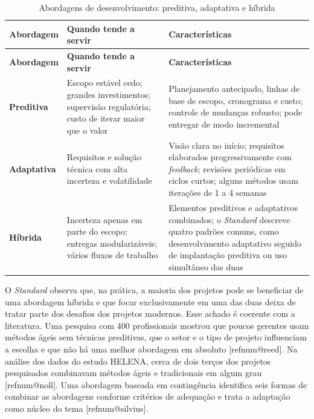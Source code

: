 \documentclass[12pt,a4paper,article,oneside,english,brazil]{abntex2}
\makeatletter
\newcommand{\fontetab}[1]{\par\vspace{3pt}{\small\noindent Fonte: #1\par}}
\newcommand{\refnum}[1]{\csname refnum@#1\endcsname}
\newcommand{\cit}[1]{[\refnum{#1}]}
\makeatother
\begin{document}
\begingroup\SingleSpacing\small
\begin{longtable}{@{}>{\raggedright\arraybackslash}p{}>{\raggedright\arraybackslash}p{}>{\raggedright\arraybackslash}p{}@{}}
\caption{Abordagens de desenvolvimento: preditiva, adaptativa e híbrida}\label{tab:t4}\\
\hline
\textbf{Abordagem} & \textbf{Quando tende a servir} & \textbf{Características}\\
\hline
\endfirsthead
\hline
\textbf{Abordagem} & \textbf{Quando tende a servir} & \textbf{Características}\\
\hline
\endhead
\hline
\endfoot
\hline
\endlastfoot
\textbf{Preditiva} & Escopo estável cedo; grandes investimentos; supervisão regulatória; custo de iterar maior que o valor & Planejamento antecipado, linhas de base de escopo, cronograma e custo; controle de mudanças robusto; pode entregar de modo incremental\\[3pt]
\textbf{Adaptativa} & Requisitos e solução técnica com alta incerteza e volatilidade & Visão clara no início; requisitos elaborados progressivamente com \textit{feedback}; revisões periódicas em ciclos curtos; alguns métodos usam iterações de 1 a 4 semanas\\[3pt]
\textbf{Híbrida} & Incerteza apenas em parte do escopo; entregas modularizáveis; vários fluxos de trabalho & Elementos preditivos e adaptativos combinados; o \textit{Standard} descreve quatro padrões comuns, como desenvolvimento adaptativo seguido de implantação preditiva ou uso simultâneo das duas\\[3pt]
\end{longtable}
\endgroup
\fontetab{Elaborado pelos autores (2026), com base em \cit{pmi}.}

O \textit{Standard} observa que, na prática, a maioria dos projetos pode se beneficiar de uma abordagem híbrida e que focar exclusivamente em uma das duas deixa de tratar parte dos desafios dos projetos modernos. Esse achado é coerente com a literatura. Uma pesquisa com 400 profissionais mostrou que poucos gerentes usam métodos ágeis sem técnicas preditivas, que o setor e o tipo de projeto influenciam a escolha e que não há uma melhor abordagem em absoluto [\refnum{reed}]. Na análise dos dados do estudo HELENA, cerca de dois terços dos projetos pesquisados combinavam métodos ágeis e tradicionais em algum grau [\refnum{noll}]. Uma abordagem baseada em contingência identifica seis formas de combinar as abordagens conforme critérios de adequação e trata a adaptação como núcleo do tema [\refnum{silvius}].
\end{document}
